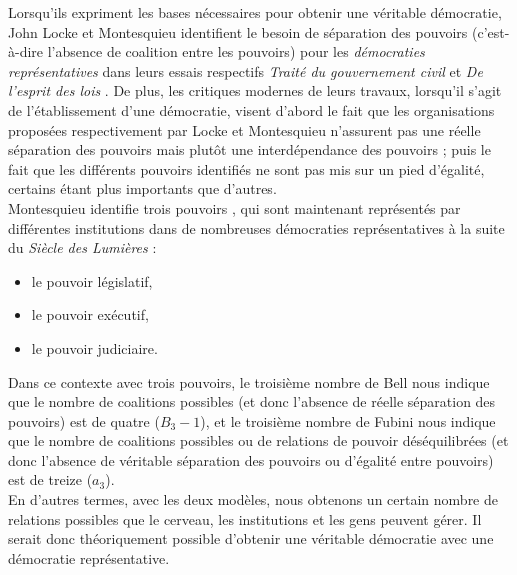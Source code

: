 Lorsqu'ils expriment les bases nécessaires pour obtenir une véritable démocratie, John Locke et Montesquieu identifient le besoin de séparation des pouvoirs (c'est-à-dire l'absence de coalition entre les pouvoirs) pour les \textit{démocraties représentatives} dans leurs essais respectifs \textit{Traité du gouvernement civil} \cite{Locke1689} et \textit{De l'esprit des lois} \cite{Montesquieu1748}. De plus, les critiques modernes de leurs travaux, lorsqu'il s'agit de l'établissement d'une démocratie, visent d'abord le fait que les organisations proposées respectivement par Locke et Montesquieu n'assurent pas une réelle séparation des pouvoirs mais plutôt une interdépendance des pouvoirs ; puis le fait que les différents pouvoirs identifiés ne sont pas mis sur un pied d'égalité, certains étant plus importants que d'autres.\\

Montesquieu identifie trois pouvoirs \cite{Montesquieu1748}, qui sont maintenant représentés par différentes institutions dans de nombreuses démocraties représentatives à la suite du \textit{Siècle des Lumières} :
\begin{itemize}
\item le pouvoir législatif,
\item le pouvoir exécutif,
\item le pouvoir judiciaire.
\end{itemize}
Dans ce contexte avec trois pouvoirs, le troisième nombre de Bell nous indique que le nombre de coalitions possibles (et donc l'absence de réelle séparation des pouvoirs) est de quatre ($B_3 - 1$), et le troisième nombre de Fubini nous indique que le nombre de coalitions possibles ou de relations de pouvoir déséquilibrées (et donc l'absence de véritable séparation des pouvoirs ou d'égalité entre pouvoirs) est de treize ($a_3$).\\
En d'autres termes, avec les deux modèles, nous obtenons un certain nombre de relations possibles que le cerveau, les institutions et les gens peuvent gérer.
Il serait donc théoriquement possible d'obtenir une véritable démocratie avec une démocratie représentative.\\


